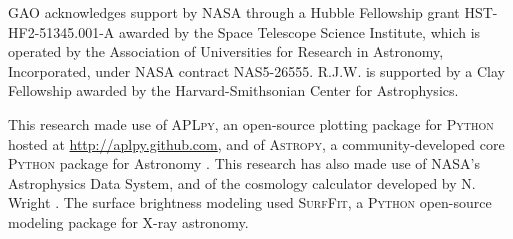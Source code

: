 GAO acknowledges support by NASA through a Hubble Fellowship grant HST-HF2-51345.001-A awarded by the Space Telescope Science Institute, which is operated by the Association of Universities for Research in Astronomy, Incorporated, under NASA contract NAS5-26555. R.J.W. is supported by a Clay Fellowship awarded by the Harvard-Smithsonian Center for Astrophysics.

This research made use of \textsc{APLpy}, an open-source plotting package for \textsc{Python} hosted at \url{http://aplpy.github.com}, and of \textsc{Astropy}, a community-developed core \textsc{Python} package
  for Astronomy \citep{astropy}. This research has also made use of NASA's Astrophysics Data System, and of the cosmology calculator developed by N. Wright \citep{Wright2006}. The surface brightness modeling used \textsc{SurfFit}, a \textsc{Python} open-source modeling package for X-ray astronomy.